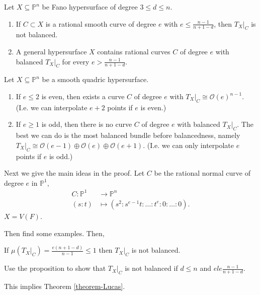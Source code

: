 \begin{theorem}
\label{theorem-Lucas}
Let $X \subseteq \mathbb{P}^n$ be Fano
hypersurface of degree $3 \leq d \leq n$.

\begin{enumerate}
\item If $C \subset X$ is a rational smooth curve
of degree $e$ with 
$e \leq  \frac{n-1}{n+1-d}$,
then $T_X|_{C}$ is not balanced.

\item A general hypersurface $X$ 
contains rational curves $C$ 
of degree $e$ with balanced
$T_X|_{C}$ for every
$e> \frac{n-1}{n+1-d}$.
\end{enumerate}

\begin{theorem}
\label{theorem-lucas2}
Let $X \subseteq \mathbb{P}^n$ be a smooth quadric hypersurface.

\begin{enumerate}
\item If $e \leq 2$ is even,
then exists a curve $C$ of degree $e$ 
with $T_X|_{C}\cong \mathcal{O}(e)^{n-1}$.
(I.e. we can interpolate $e+2$ points
if $e$ is even.)

\item If $e \geq 1$ is odd,
then there is no curve $C$ of degree $e$ 
with balanced $T_X|_C$.
The best we can do is the most balanced bundle
before balancedness, namely
$T_X|_C \cong \mathcal{O}(e-1)\oplus\mathcal{O}(e)\oplus\mathcal{O}(e+1)$. 
(I.e. we can only interpolate $e$ points if $e$ is odd.)
\end{enumerate}

Next we give the main ideas in the proof.
Let $C$ be the rational normal curve
of degree $e$ in $\mathbb{P}^1$,
\begin{align*}
C:\mathbb{P}^1  &\longrightarrow \mathbb{P}^n \\
(s:t) &\longmapsto (s^2:s^{e-1}t:\ldots:t^e:0:\ldots:0).
\end{align*}
$X=V(F)$.

Then find some examples. Then,

\begin{proposition}
\label{proposition-proposition}
If $\mu(T_X|_{C})=\frac{e(n+1-d)}{n-1}\leq 1$
then $T_X|_{C}$ is not balanced.
\end{proposition}

\noindent
Use the proposition to show that $T_X|_C$
is not balanced if $d \leq  n$ 
and $e le \frac{ n-1}{n+1-d}$.

This implies Theorem \ref{theorem-Lucas}.


\end{theorem}
\end{theorem}
